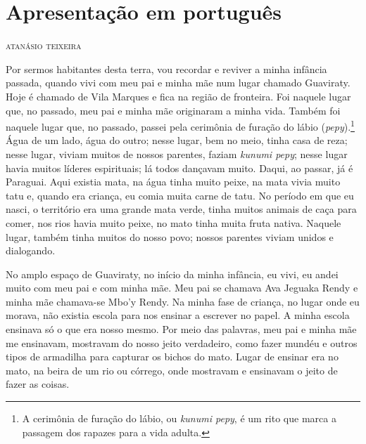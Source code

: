 
\chapter*{Apresentação em português\smallskip{}}

\vspace*{4\baselineskip}

\begin{flushright}
\textsc{atanásio teixeira}
\end{flushright}

\noindent{}Por sermos habitantes desta terra, vou recordar e reviver a minha
infância passada, quando vivi com meu pai e minha mãe num lugar chamado
Guaviraty. Hoje é chamado de Vila Marques e fica na região de fronteira.
Foi naquele lugar que, no passado, meu pai e minha mãe originaram a
minha vida. Também foi naquele lugar que, no passado, passei pela
cerimônia de furação do lábio (\emph{pepy}).\footnote{A cerimônia de furação do lábio, ou \emph{kunumi pepy}, é um rito que marca a passagem dos rapazes para a vida adulta.} Água de um lado, água do outro; nesse lugar, bem no meio, tinha casa de reza; nesse lugar, viviam
muitos de nossos parentes, faziam \emph{kunumi pepy}; nesse lugar havia
muitos líderes espirituais; lá todos dançavam muito. Daqui, ao passar,
já é Paraguai. Aqui existia mata, na água tinha muito peixe, na mata
vivia muito tatu e, quando era criança, eu comia muita carne de tatu. No
período em que eu nasci, o território era uma grande mata verde, tinha
muitos animais de caça para comer, nos rios havia muito peixe, no mato
tinha muita fruta nativa. Naquele lugar, também tinha muitos do nosso
povo; nossos parentes viviam unidos e dialogando.

No amplo espaço de Guaviraty, no início da minha infância, eu vivi, eu
andei muito com meu pai e com minha mãe. Meu pai se chamava Ava Jeguaka
Rendy e minha mãe chamava-se Mbo'y Rendy. Na minha fase de criança, no
lugar onde eu morava, não existia escola para nos ensinar a escrever no
papel. A minha escola ensinava só o que era nosso mesmo. Por meio das
palavras, meu pai e minha mãe me ensinavam, mostravam do nosso jeito
verdadeiro, como fazer mundéu e outros tipos de armadilha para capturar
os bichos do mato. Lugar de ensinar era no mato, na beira de um rio ou
córrego, onde mostravam e ensinavam o jeito de fazer as coisas.

